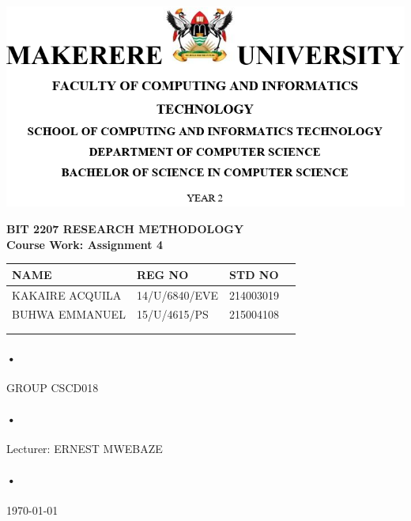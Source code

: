 \documentclass[12pt]{report}
\begin{document}
\begin{center}
\includegraphics[scale=0.7]{Capture.PNG}\\
\vspace{1cm}
\begin{normalsize}
\textbf{BIT 2207 RESEARCH METHODOLOGY} \\
\vspace{1cm}
\textbf{Course Work: Assignment 4}\\
\end{normalsize}
\end{center}

\begin{center}
\begin{tabular}{|l|l|l|c|}
\hline \textbf{NAME}  & \textbf{REG NO} & \textbf{STD NO} \\\hline
KAKAIRE ACQUILA & 14/U/6840/EVE & 214003019 \\\hline
BUHWA EMMANUEL & 15/U/4615/PS & 215004108 \\\hline
 &  &  \\\hline
 &  &  \\\hline
\end{tabular}
\paragraph{•}
GROUP CSCD018\\
\paragraph{•}
Lecturer: ERNEST MWEBAZE \\
\paragraph{•}
\today

\end{center}
\end{document}
